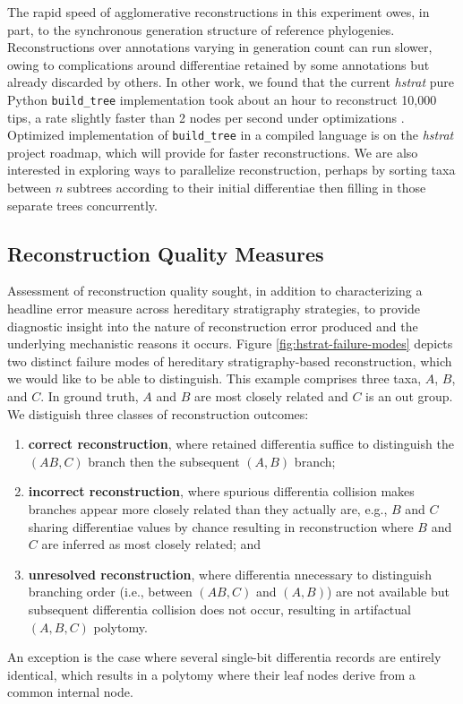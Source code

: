 The rapid speed of agglomerative reconstructions in this experiment owes, in part, to the synchronous generation structure of reference phylogenies.
Reconstructions over annotations varying in generation count can run slower, owing to complications around differentiae retained by some annotations but already discarded by others.
In other work, we found that the current \textit{hstrat} pure Python \texttt{build\_tree} implementation took about an hour to reconstruct 10,000 tips, a rate slightly faster than 2 nodes per second under optimizations \citep{moreno2024trackable}.
Optimized implementation of \texttt{build\_tree} in a compiled language is on the \textit{hstrat} project roadmap, which will provide for faster reconstructions.
We are also interested in exploring ways to parallelize reconstruction, perhaps by sorting taxa between $n$ subtrees according to their initial differentiae then filling in those separate trees concurrently.

\subsection{Reconstruction Quality Measures}



Assessment of reconstruction quality sought, in addition to  characterizing a headline error measure across hereditary stratigraphy strategies, to provide diagnostic insight into the nature of reconstruction error produced and the underlying mechanistic reasons it occurs.
Figure \ref{fig:hstrat-failure-modes} depicts two distinct failure modes of hereditary stratigraphy-based reconstruction, which we would like to be able to distinguish.
This example comprises three taxa, $A$, $B$, and $C$.
In ground truth, $A$ and $B$ are most closely related and $C$ is an out group.
We distiguish three classes of reconstruction outcomes:
\begin{enumerate}
\item \textbf{correct reconstruction}, where retained differentia suffice to distinguish the $(AB,C)$ branch then the subsequent $(A,B)$ branch;
\item \textbf{incorrect reconstruction}, where spurious differentia collision makes branches appear more closely related than they actually are, e.g., $B$ and $C$ sharing differentiae values by chance resulting in reconstruction where $B$ and $C$ are inferred as most closely related; and
\item \textbf{unresolved reconstruction}, where differentia nnecessary to distinguish branching order (i.e., between $(AB,C)$ and $(A,B)$) are not available but subsequent differentia collision does not occur, resulting in artifactual $(A,B,C)$ polytomy.
\end{enumerate}
An exception is the case where several single-bit differentia records are entirely identical, which results in a polytomy where their leaf nodes derive from a common internal node.

